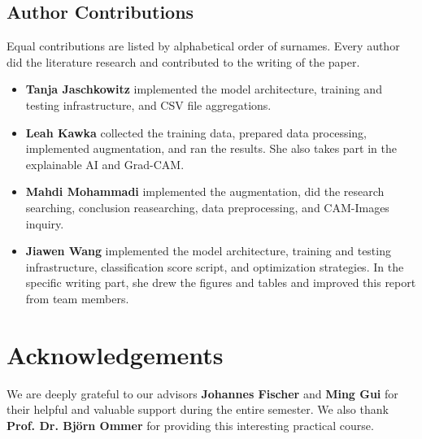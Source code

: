 \subsection*{Author Contributions}
\label{sec:author}
Equal contributions are listed by alphabetical order of surnames. 
Every author did the literature research and contributed to the writing of the paper. 

\begin{itemize}
  \item \textbf{Tanja Jaschkowitz} implemented the model architecture, training and testing infrastructure, and CSV file aggregations. 
  \item \textbf{Leah Kawka} collected the training data, prepared data processing, implemented augmentation, and ran the results. 
  She also takes part in the explainable AI and Grad-CAM.
  \item \textbf{Mahdi Mohammadi} implemented the augmentation, did the research searching, conclusion reasearching, data preprocessing, and CAM-Images inquiry.
  \item \textbf{Jiawen Wang} implemented the model architecture, training and testing infrastructure, classification score script, and optimization strategies. 
  In the specific writing part, she drew the figures and tables and improved this report from team members.
\end{itemize}

\section*{Acknowledgements}

We are deeply grateful to our advisors \textbf{Johannes Fischer} and \textbf{Ming Gui} for their helpful and valuable support during the entire semester. 
We also thank \textbf{Prof. Dr. Björn Ommer} for providing this interesting practical course.
